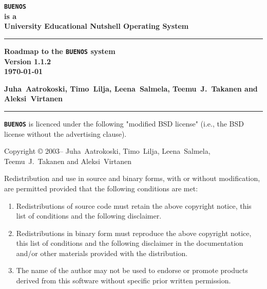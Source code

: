 \documentclass[twoside,a4paper]{report}
\newcommand{\buenos}{\texttt{\textbf{BUENOS}}}
\newcommand{\authors}{%
Juha~Aatrokoski, Timo~Lilja, Leena~Salmela, %
Teemu~J.~Takanen and Aleksi~Virtanen%
}
\begin{document}
\pagestyle{plain}
\begin{titlepage}
{
\raggedright\bfseries\Huge
\texttt{BUENOS}\\
\large
\hspace{1em}is a\\
University Educational Nutshell Operating System\\
\rule{\textwidth}{2mm}
\raggedleft\bfseries\large
Roadmap to the \texttt{BUENOS} system\\
Version 1.1.2\\
\today\\
\raggedright\bfseries\large
\authors{}\\
\rule{\textwidth}{1mm}
}
\newpage
{}
\noindent

\noindent\buenos{} is licenced under the following "modified BSD
license" (i.e., the BSD license without the advertising clause).

\begin{flushleft}
\vspace{\baselineskip}
Copyright \copyright{} 2003--\number\year{} \authors{}
\vspace{\baselineskip}
\end{flushleft}

Redistribution and use in source and binary forms, with or without
modification, are permitted provided that the following conditions
are met:

\begin{enumerate}
\item Redistributions of source code must retain the above copyright
    notice, this list of conditions and the following disclaimer.
\item Redistributions in binary form must reproduce the above
    copyright notice, this list of conditions and the following
    disclaimer in the documentation and/or other materials provided
    with the distribution.
\item The name of the author may not be used to endorse or promote
    products derived from this software without specific prior
    written permission.
\end{enumerate}


\end{titlepage}
\end{document}

